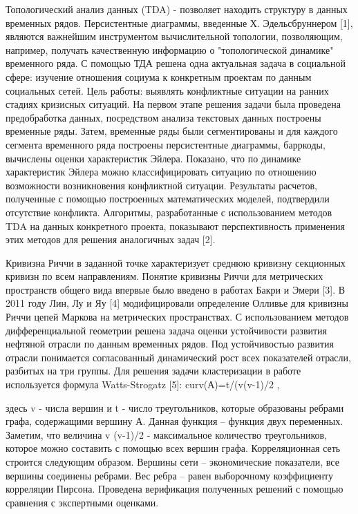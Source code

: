 Топологический анализ данных (TDA) - позволяет находить структуру в данных временных рядов. Персистентные диаграммы, введенные Х. Эдельсбруннером [1], являются важнейшим инструментом вычислительной топологии, позволяющим, например, получать качественную информацию о "топологической динамике" временного ряда.   С помощью ТДА решена одна актуальная задача в социальной сфере: изучение отношения социума к конкретным проектам по данным социальных сетей. Цель работы: выявлять конфликтные ситуации на ранних стадиях кризисных ситуаций.  На первом этапе решения задачи была проведена предобработка данных, посредством анализа текстовых данных построены временные ряды. Затем, временные ряды были сегментированы и для каждого сегмента временного ряда построены персистентные диаграммы,  барркоды, вычислены оценки характеристик Эйлера. Показано, что по динамике характеристик Эйлера можно классифицировать ситуацию по отношению возможности возникновения  конфликтной ситуации. Результаты расчетов, полученные с помощью построенных математических моделей, подтвердили отсутствие конфликта. Алгоритмы, разработанные с использованием методов TDA на данных конкретного проекта, показывают перспективность применения этих методов для решения аналогичных задач [2].

Кривизна Риччи в заданной точке характеризует среднюю кривизну секционных кривизн по всем направлениям. Понятие кривизны Риччи для метрических пространств общего вида впервые было введено в работах Бакри и Эмери [3]. В 2011 году Лин, Лу и Яу [4] модифицировали определение Олливье для кривизны Риччи цепей Маркова на метрических пространствах.
С использованием методов дифференциальной геометрии решена задача оценки устойчивости развития нефтяной отрасли по данным временных рядов. Под устойчивостью развития отрасли понимается согласованный динамический рост всех показателей отрасли, разбитых на три группы.
Для решения задачи кластеризации в работе используется формула Watts-Strogatz [5]:
curv(А)=t/(v(v-1)/2 ,

здесь v - числа вершин и t - число треугольников, которые образованы ребрами графа, содержащими вершину А. Данная функция – функция двух переменных. Заметим, что величина v (v-1)/2 - максимальное количество треугольников, которое можно составить с помощью всех вершин графа.
Корреляционная сеть строится следующим образом. Вершины сети – экономические показатели, все вершины соединены ребрами. Вес ребра – равен выборочному коэффициенту корреляции Пирсона. Проведена верификация полученных решений с помощью сравнения с экспертными оценками.

